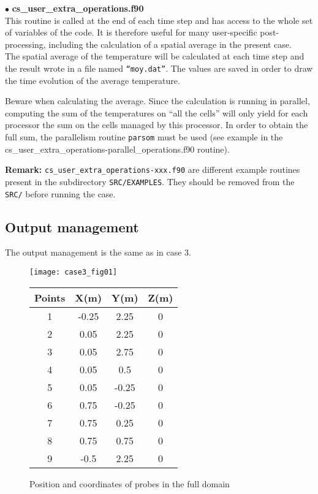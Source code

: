 $\bullet$ {\bfseries cs\_user\_extra\_operations.f90}\\
This routine is called at the end of each time step and has access to the whole
set of variables of the code. It is therefore useful for many user-specific
post-processing, including the calculation of a spatial average in the present
case.\\
The spatial average of the temperature will be calculated at each time step and
the result wrote in a file named \texttt{``moy.dat''}. The values are saved in order
to draw the time evolution of the average temperature.

Beware when calculating the average. Since the calculation is running in
parallel, computing the sum of the temperatures on ``all the cells'' will only
yield for each processor the sum on the cells managed by this processor. In
order to obtain the full sum, the parallelism routine \texttt{parsom} must be
used (see example in the cs\_user\_extra\_operations-parallel\_operations.f90 routine).

\textbf{Remark:} \texttt{cs\_user\_extra\_operations-xxx.f90} are different example routines
present in the subdirectory  \texttt{SRC/EXAMPLES}. They should be removed from the \texttt{SRC/}
before running the case.


        \subsection{Output management}

The output management is the same as in case 3.

\begin{figure}[htp]
\parbox{8cm}{%
\centerline{\texttt{[image: case3\_fig01]}}}
\parbox{7cm}{%
\begin{center}
\begin{tabular}{|c|c|c|c|}
\hline
Points & X(m) & Y(m) & Z(m)\\
\hline
1 & -0.25 & 2.25 & 0 \\
\hline
2 & 0.05 & 2.25 & 0 \\
\hline
3 & 0.05 & 2.75 & 0 \\
\hline
4 & 0.05 & 0.5 & 0 \\
\hline
5 & 0.05 & -0.25 & 0 \\
\hline
6 & 0.75 & -0.25 & 0 \\
\hline
7 & 0.75 & 0.25 & 0 \\
\hline
8 & 0.75 & 0.75 & 0 \\
\hline
9 & -0.5 & 2.25 & 0 \\
\hline
\end{tabular}
\end{center}
}
\caption{Position and coordinates of probes in the full domain}
\label{figante42}
\end{figure}

